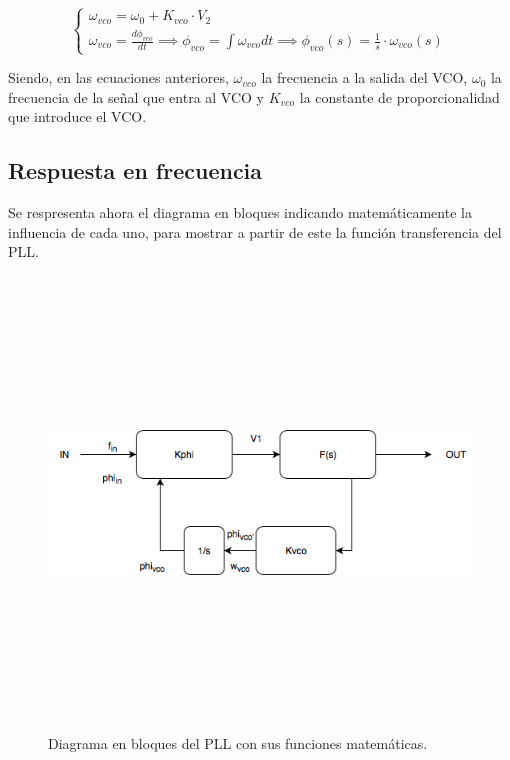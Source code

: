 	\begin{equation}
		\begin{cases}
			\omega_{vco} =\omega_0 + K_{vco} \cdot V_2\\
			\omega_{vco} = \frac{d \phi_{vco}}{dt} \implies \phi_{vco} = \int \omega_{vco} dt \implies \phi_{vco}(s) = \frac{1}{s} \cdot \omega_{vco}(s)
		\end{cases}
	\end{equation}
	
	Siendo, en las ecuaciones anteriores, $\omega_{vco}$ la frecuencia a la salida del VCO, $\omega_0$ la frecuencia de la señal que entra al VCO y $K_{vco}$ la constante de proporcionalidad que introduce el VCO.
	
	
\subsection{Respuesta en frecuencia}

Se respresenta ahora el diagrama en bloques indicando matem\'aticamente la influencia de cada uno, para mostrar a partir de este la funci\'on transferencia del PLL.

\begin{figure}[H] %
	\centering
	\includegraphics[width=12cm,height=12cm,keepaspectratio]{../EJ2/imagenes/transf.png}
	\caption{Diagrama en bloques del PLL con sus funciones matem\'aticas.}
	\label{pll2}
\end{figure}

